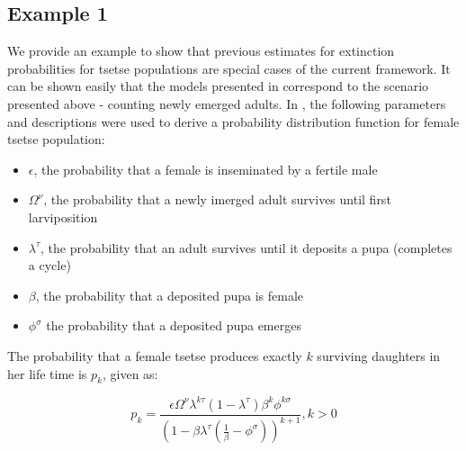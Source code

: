 \documentclass[smallextended]{svjour3}
\begin{document}

\subsection{Example 1}

We provide an example to show that previous estimates for extinction probabilities for tsetse populations are special cases of the current framework. It can be shown easily that the models presented in \cite{Hargrove2005a,Kajunguri2019,Are2019} correspond to the scenario presented above - counting newly emerged adults. In \cite{Are2019}, the following parameters and descriptions were used to derive a probability distribution function for female tsetse population: 
\begin{itemize}
	\item $\epsilon$, the probability that a female is inseminated by a fertile male 
	\item $\Omega^{\nu}$,  the probability that a newly imerged adult survives until first larviposition
	\item $ \lambda^{\tau}$, the probability that an adult survives until it deposits a pupa (completes a cycle)
	\item $\beta$,  the probability that a deposited pupa is female 
	\item $\phi^{\sigma}$  the probability that a deposited pupa emerges
\end{itemize}

The probability that a female tsetse produces exactly $k$ surviving daughters in her life time is $p_{k}$, given as:

\begin{equation}
	\label{Johnframework}
	p_{k}= \frac{\epsilon \Omega^{\nu}\lambda^{k\tau}(1-\lambda^{\tau})\beta^{k}\phi^{k\sigma}}{(1-\beta \lambda^\tau(\frac{1}{\beta} -\phi^{\sigma}))^{k+1}},   k>0   
\end{equation}
\end{document}

